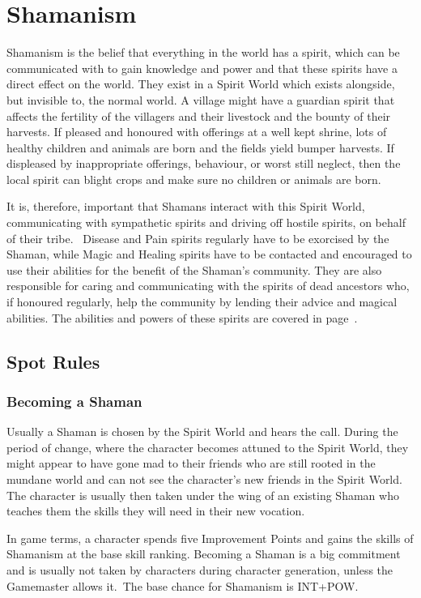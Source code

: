 \chapter{Shamanism}
\label{ch:shamanism}

Shamanism is the belief that everything in the world has a spirit, which can be communicated with to gain knowledge and power and that these spirits have a direct effect on the world. They exist in a Spirit World which exists alongside, but invisible to, the normal world. A village might have a guardian spirit that affects the fertility of the villagers and their livestock and the bounty of their harvests. If pleased and honoured with offerings at a well kept shrine, lots of healthy children and animals are born and the fields yield bumper harvests. If displeased by inappropriate offerings, behaviour, or worst still neglect, then the local spirit can blight crops and make sure no children or animals are born.

It is, therefore, important that Shamans interact with this Spirit World, communicating with sympathetic spirits and driving off hostile spirits, on behalf of their tribe.  Disease and Pain spirits regularly have to be exorcised by the Shaman, while Magic and Healing spirits have to be contacted and encouraged to use their abilities for the benefit of the Shaman’s community. They are also responsible for caring and communicating with the spirits of dead ancestors who, if honoured regularly, help the community by lending their advice and magical abilities. The abilities and powers of these spirits are covered in page~\pageref{sec:spirits}.


\section{Spot Rules}

\subsection{Becoming a Shaman}
Usually a Shaman is chosen by the Spirit World and hears the call. During the period of change, where the character becomes attuned to the Spirit World, they might appear to have gone mad to their friends who are still rooted in the mundane world and can not see the character’s new friends in the Spirit World.  The character is usually then taken under the wing of an existing Shaman who teaches them the skills they will need in their new vocation.

In game terms, a character spends five Improvement Points and gains the skills of Shamanism at the base skill ranking. Becoming a Shaman is a big commitment and is usually not taken by characters during character generation, unless the Gamemaster allows it. The base chance for Shamanism is INT+POW.

